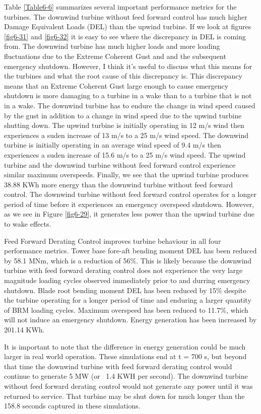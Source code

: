 Table \ref{Table6-6} summarizes several important performance metrics for the turbines. The downwind turbine without feed forward control has much higher Damage Equivalent Loads (DEL) than the upwind turbine. If we look at figures \ref{fig6-31} and \ref{fig6-32} it is easy to see where the discrepancy in DEL is coming from. The downwind turbine has much higher loads and more loading fluctuations due to the Extreme Coherent Gust and and the subsequent emergency shutdown. However, I think it's useful to discuss what this means for the turbines and what the root cause of this discrepancy is. This discrepancy means that an Extreme Coherent Gust large enough to cause emergency shutdown is more damaging to a turbine in a wake than to a turbine that is not in a wake. The downwind turbine has to endure the change in wind speed caused by the gust in addition to a change in wind speed due to the upwind turbine shutting down. The upwind turbine is initially operating in 12 m/s wind then experiences a suden increase of 13 m/s to a 25 m/s wind speed. The downwind turbine is initially operating in an average wind speed of 9.4 m/s then experiences a suden increase of 15.6 m/s to a 25 m/s wind speed. The upwind turbine and the downwind turbine without feed forward control experience similar maximum overspeeds. Finally, we see that the upwind turbine produces 38.88 KWh more energy than the downwind turbine without feed forward control. The downwind turbine without feed forward control operates for a longer period of time before it experiences an emergency overspeed shutdown. However, as we see in Figure \ref{fig6-29}, it generates less power than the upwind turbine due to wake effects.

Feed Forward Derating Control improves turbine behaviour in all four performance metrics. Tower base fore-aft bending moment DEL has been reduced by 58.1 MNm, which is a reduction of 56\%. This is likely because the downwind turbine with feed forward derating control does not experience the very large magnitude loading cycles observed immediately prior to and durring emergency shutdown. Blade root bending moment DEL has been reduced by 15\% despite the turbine operating for a longer period of time and enduring a larger quantity of BRM loading cycles. Maximum overspeed has been reduced to 11.7\%, which will not induce an emergency shutdown. Energy generation has been increased by 201.14 KWh.

It is important to note that the difference in energy generation could be much larger in real world operation. These simulations end at t = 700 s, but beyond that time the downwind turbine with feed forward derating control would continue to generate 5 MW (or ~1.4 KWH per second). The downwind turbine without feed forward derating control would not generate any power until it was returned to service. That turbine may be shut down for much longer than the 158.8 seconds captured in these simulations.


